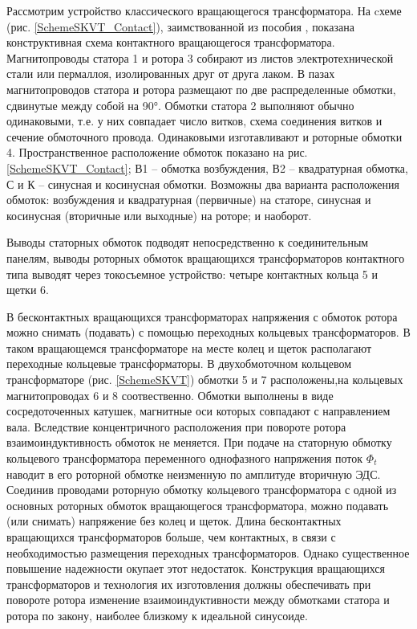 Рассмотрим устройство классического вращающегося трансформатора.
На cхеме (рис. \ref{SchemeSKVT_Contact}), заимствованной из пособия \cite{AutoDevices}, показана конструктивная схема контактного вращающегося трансформатора. 
Магнитопроводы статора 1 и ротора 3 собирают из листов электротехнической стали или пермаллоя, 
изолированных друг от друга лаком. В пазах магнитопроводов статора и ротора размещают по две распределенные обмотки, сдвинутые между собой на 90°. 
Обмотки статора 2 выполняют обычно одинаковыми, т.е. у них совпадает число витков, схема соединения витков и сечение обмоточного провода. 
Одинаковыми изготавливают и роторные обмотки 4. Пространственное расположение обмоток показано на рис. \ref{SchemeSKVT_Contact}; В1 – обмотка возбуждения, В2 – квадратурная обмотка, 
С и К – синусная и косинусная обмотки. Возможны два варианта расположения обмоток: возбуждения и квадратурная (первичные) на статоре, 
синусная и косинусная (вторичные или выходные) на роторе; и наоборот. 

Выводы статорных обмоток подводят непосредственно к соединительным панелям, выводы роторных обмоток вращающихся трансформаторов контактного типа 
выводят через токосъемное устройство: четыре контактных кольца 5 и щетки 6.

В бесконтактных вращающихся трансформаторах напряжения с обмоток ротора можно снимать (подавать) с помощью переходных кольцевых трансформаторов.
В таком вращающемся трансформаторе на месте колец и щеток располагают переходные кольцевые трансформаторы. 
В двухобмоточном кольцевом трансформаторе (рис. \ref{SchemeSKVT}) обмотки 5 и 7 расположены,на кольцевых магнитопроводах 6 и 8 соотвественно.    
Обмотки выполнены в виде сосредоточенных катушек, магнитные оси которых совпадают с направлением вала. Вследствие концентричного расположения при повороте ротора взаимоиндуктивность 
обмоток не меняется. При подаче на статорную обмотку кольцевого трансформатора переменного однофазного напряжения поток $ \Phi_t $ наводит в его роторной обмотке неизменную по амплитуде вторичную ЭДС. 
Соединив проводами роторную обмотку кольцевого трансформатора с одной из основных роторных обмоток вращающегося трансформатора, можно подавать (или снимать) напряжение без колец и щеток. 
Длина бесконтактных вращающихся трансформаторов больше, чем контактных, в связи с необходимостью размещения переходных трансформаторов. Однако существенное повышение надежности 
окупает этот недостаток. Конструкция вращающихся трансформаторов и технология их изготовления должны обеспечивать при повороте ротора изменение взаимоиндуктивности между обмотками статора и ротора по закону, 
наиболее близкому к идеальной синусоиде.



